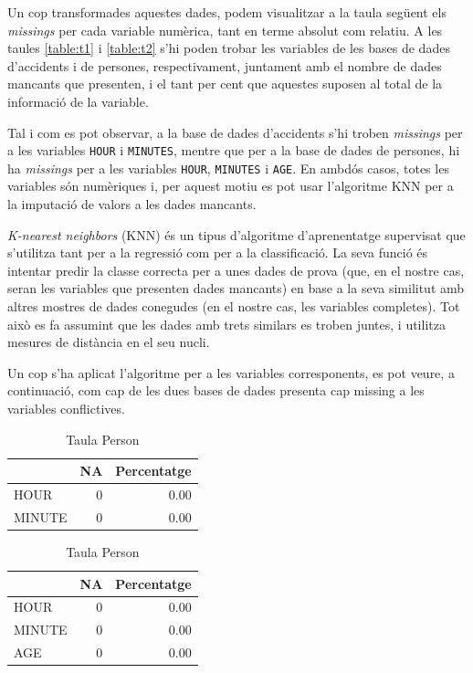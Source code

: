 \documentclass[12pt,longbibliography]{article}
\theoremstyle{definition}
\theoremstyle{remark}
\begin{document}
Un cop transformades aquestes dades, podem visualitzar a la taula següent els \emph{missings} per cada variable numèrica, tant en terme absolut com relatiu. A les taules \ref{table:t1} i \ref{table:t2} s'hi poden trobar les variables de les bases de dades d'accidents i de persones, respectivament, juntament amb el nombre de dades mancants que presenten, i el tant per cent que aquestes suposen al total de la informació de la variable.


Tal i com es pot observar, a la base de dades d'accidents s'hi troben \emph{missings} per a les variables \texttt{HOUR} i \texttt{MINUTES}, mentre que per a la base de dades de persones, hi ha \emph{missings} per a les variables \texttt{HOUR}, \texttt{MINUTES} i \texttt{AGE}. En ambdós casos, totes les variables són numèriques i, per aquest motiu es pot usar l'algoritme KNN per a la imputació de valors a les dades mancants.


\emph{K-nearest neighbors} (KNN) és un tipus d'algoritme d'aprenentatge supervisat que s'utilitza tant per a la regressió com per a la classificació. La seva funció és intentar predir la classe correcta per a unes dades de prova (que, en el nostre cas, seran les variables que presenten dades mancants) en base a la seva similitut amb altres mostres de dades conegudes (en el nostre cas, les variables completes). Tot això es fa assumint que les dades amb trets similars es troben juntes, i utilitza mesures de distància en el seu nucli.


Un cop s'ha aplicat l'algoritme per a les variables corresponents, es pot veure, a continuació, com cap de les dues bases de dades presenta cap missing a les variables conflictives.




\begin{table}[H]
\parbox{.45\linewidth}{
\centering
\begin{tabular}{l|r|r|}
\cline{2-3}
\textbf{} & \multicolumn{1}{l|}{\textbf{NA}} & \multicolumn{1}{l|}{\textbf{Percentatge}} \\ \hline
\multicolumn{1}{|l|}{HOUR}        & 0 & 0.00 \\ \hline
\multicolumn{1}{|l|}{MINUTE}      & 0 & 0.00 \\ \hline
\end{tabular}
\caption{Taula Accident \label{table:t3}}
}
\hfill
\parbox{.45\linewidth}{
\centering
\begin{tabular}{l|r|r|}
\cline{2-3}
\textbf{} & \multicolumn{1}{l|}{\textbf{NA}} & \multicolumn{1}{l|}{\textbf{Percentatge}} \\ \hline
\multicolumn{1}{|l|}{HOUR}        & 0  & 0.00 \\ \hline
\multicolumn{1}{|l|}{MINUTE}      & 0 & 0.00 \\ \hline
\multicolumn{1}{|l|}{AGE}         & 0 & 0.00 \\ \hline
\end{tabular}
\caption{Taula Person \label{table:t4}}
}
\end{table}
\end{document}
